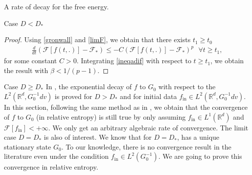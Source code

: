 \documentclass[reqno]{amsart} %
\begin{document}
\begin{section}{A rate of decay for the free energy.}
\begin{subsection}{Case \texorpdfstring{$D<D_*$}{DD*}}
\begin{proof}
Using \eqref{gronwall} and \eqref{limF}, we obtain  that there exists $t_1\geq t_0$
\begin{align}
\label{ineqadif}
    \frac{d}{dt} (\mathcal{F}[f(t,.)]-\mathcal{F}_*) \leq  -C(\mathcal{F}[f(t,.)]-\mathcal{F}_*)^{p} \, \,\,\,\forall t \geq t_1,
\end{align}
for some constant $C>0$. Integrating \eqref{ineqadif} with respect to $t\geq t_1$, we obtain the result with $\beta<1/(p-1)$.

\end{proof}

\end{subsection}
\begin{subsection}{Case \texorpdfstring{$D\geq D_*$}{DD*}}
\label{sec: D D*}
In \cite{Li2021}, the exponential decay of $f $ to $G_0$ with respect to the $L^2(\mathbb{R}^d,G_0^{-1}dv)$ is proved for $D>D_*$ and for initial data $f_{\mathrm{in}} \in L^2(\mathbb{R}^d,G_0^{-1}dv)$. In this section, following the same method as in 
, we obtain that the convergence of $f$ to $G_0$ (in relative entropy) is still true by only assuming $f_{\mathrm{in}} \in L^1(\mathbb{R}^d)$ and $\mathcal{F}[f_{\mathrm{in}}]<+ \infty$. We only get an arbitrary algebraic rate of convergence. The limit case $D=D_*$ is also of interest. We know that for $D=D_*$,  has a unique stationary state $G_0$. To our knowledge, there is no convergence result in the literature even under the  condition  $f_{\mathrm{in}} \in L^2(G_0^{-1})$. We are going to prove this convergence in relative entropy.  



\end{subsection}
\end{section}
\end{document}
